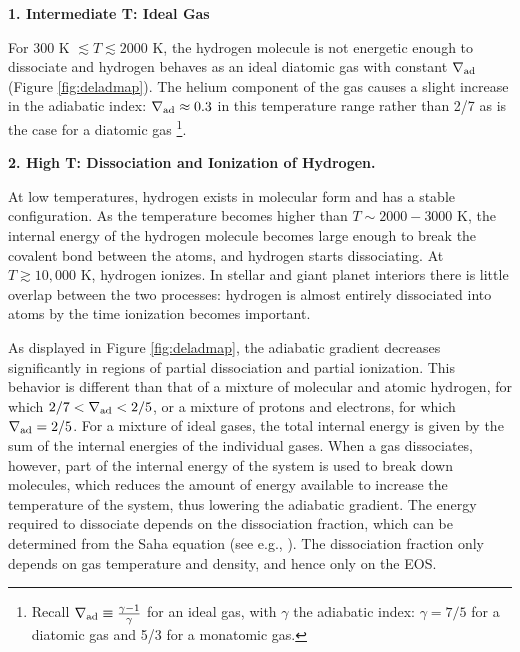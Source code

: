 \documentclass[apj]{emulateapj}
\newcommand{\delad}{\nabla_{\rm ad}}
\begin{document}

\vspace{0.2in}

\textbf{1. Intermediate T: Ideal Gas}

For $300$ K $\lesssim T \lesssim 2000$ K, the hydrogen molecule is not energetic enough to dissociate and hydrogen behaves as an ideal diatomic gas with constant $\delad$ (Figure \ref{fig:deladmap}). The helium component of the gas causes a slight increase in the adiabatic index: $\delad \approx 0.3$ in this temperature range rather than 2/7 as is the case for a diatomic gas \footnote{Recall $\delad \equiv \frac{\gamma-1}{\gamma}$ for an ideal gas, with $\gamma$ the adiabatic index: $\gamma=7/5$ for a diatomic gas and 5/3 for a monatomic gas.}.

\vspace{0.2in}

\textbf{2. High T: Dissociation and Ionization of Hydrogen.}

At low temperatures, hydrogen exists in molecular form and has a stable configuration. As the temperature becomes higher than $T \sim 2000-3000$ K, the internal energy of the hydrogen molecule becomes large enough to break the covalent bond between the atoms, and hydrogen starts dissociating. At $T \gtrsim 10,000$ K, hydrogen ionizes. In stellar and giant planet interiors there is little overlap between the two processes: hydrogen is almost entirely dissociated into atoms by the time ionization becomes important. 

As displayed in Figure \ref{fig:deladmap}, the adiabatic gradient decreases significantly in regions of partial dissociation and partial ionization. This behavior is different than that of a mixture of molecular and atomic hydrogen, for which $2/7<\delad<2/5$, or a mixture of protons and electrons, for which $\delad=2/5$. For a mixture of ideal gases, the total internal energy is given by the sum of the internal energies of the individual gases. When a gas dissociates, however, part of the internal energy of the system is used to break down molecules, which reduces the amount of energy available to increase the temperature of the system, thus lowering the adiabatic gradient. The energy required to dissociate depends on the dissociation fraction, which can be determined from the Saha equation (see e.g., \citealt{kippenhahn90}). The dissociation fraction only depends on gas temperature and density, and hence only on the EOS. 
\end{document}
